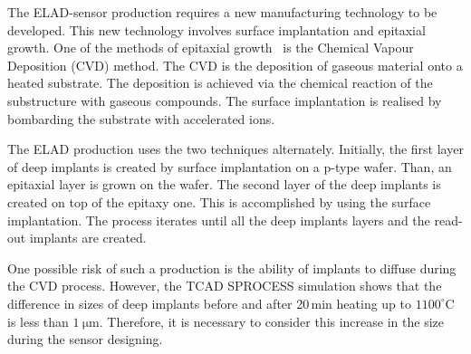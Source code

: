 
The ELAD-sensor production requires a new manufacturing technology to be developed. 
This new technology involves surface implantation and epitaxial growth. 
One of the methods of epitaxial growth~\cite{Lutz} is the Chemical Vapour Deposition (CVD) method. 
The CVD is the deposition of gaseous material onto a heated substrate. 
The deposition is achieved via the chemical reaction of the substructure with gaseous compounds. 
The surface implantation is realised by bombarding the substrate with accelerated ions.

The ELAD production uses the two techniques alternately. 
Initially, the first layer of deep implants is created by surface implantation on a p-type wafer. 
Than, an epitaxial layer is grown on the wafer. The second layer of the deep implants is created on top of the epitaxy one. This is accomplished by using the surface implantation. The process iterates until all the deep implants layers and the read-out implants are created. %

One possible risk of such a production is the ability of implants to diffuse during the CVD process. 
However, the TCAD SPROCESS simulation shows that the difference in sizes of deep implants before and after 20\,min heating up to $1100^\circ$C is less than $\SI{1}{\um}$. 
Therefore, it is necessary to consider this increase in the size during the sensor designing.%
